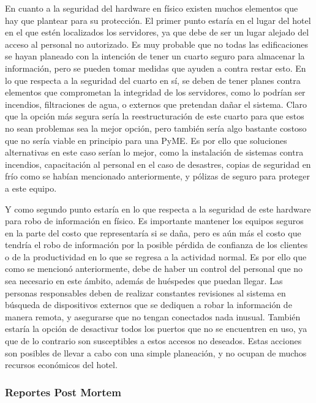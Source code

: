 \documentclass[10pt]{article}
\begin{document}
En cuanto a la seguridad del hardware en físico existen muchos elementos que hay que plantear para su protección. El primer punto estaría en el lugar del hotel en el que estén localizados los servidores, ya que debe de ser un lugar alejado del acceso al personal no autorizado. Es muy probable que no todas las edificaciones se hayan planeado con la intención de tener un cuarto seguro para almacenar la información, pero se pueden tomar medidas que ayuden a contra restar esto. En lo que respecta a la seguridad del cuarto en sí, se deben de tener planes contra elementos que comprometan la integridad de los servidores, como lo podrían ser incendios, filtraciones de agua, o externos que pretendan dañar el sistema. Claro que la opción más segura sería la reestructuración de este cuarto para que estos no sean problemas sea la mejor opción, pero también sería algo bastante costoso que no sería viable en principio para una PyME. Es por ello que soluciones alternativas en este caso serían lo mejor, como la instalación de sistemas contra incendios, capacitación al personal en el caso de desastres, copias de seguridad en frío como se habían mencionado anteriormente, y pólizas de seguro para proteger a este equipo.   

Y como segundo punto estaría en lo que respecta a la seguridad de este hardware para robo de información en físico. Es importante mantener los equipos seguros en la parte del costo que representaría si se daña, pero es aún más el costo que tendría el robo de información por la posible pérdida de confianza de los clientes o de la productividad en lo que se regresa a la actividad normal. Es por ello que como se mencionó anteriormente, debe de haber un control del personal que no sea necesario en este ámbito, además de huéspedes que puedan llegar. Las personas responsables deben de realizar constantes revisiones al sistema en búsqueda de dispositivos externos que se dediquen a robar la información de manera remota, y asegurarse que no tengan conectados nada inusual. También estaría la opción de desactivar todos los puertos que no se encuentren en uso, ya que de lo contrario son susceptibles a estos accesos no deseados. Estas acciones son posibles de llevar a cabo con una simple planeación, y no ocupan de muchos recursos económicos del hotel. 

\subsubsection{Reportes Post Mortem}
\end{document}
